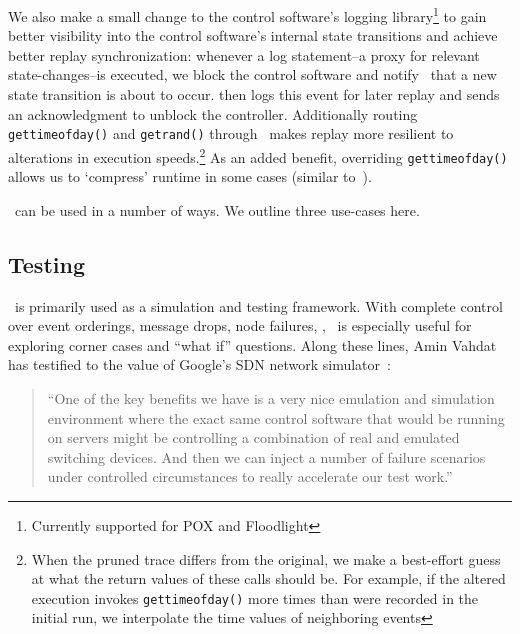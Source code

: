 We also make a
small change to the control software's logging library\footnote{Currently
supported for POX
and Floodlight} to gain better visibility into the control software's internal state
transitions and achieve better replay synchronization: whenever a log
statement--a proxy for relevant state-changes--is executed, we
block the control software and notify \projectname~that a new state transition
is about to occur. \projectname then logs this event for later replay and
sends an acknowledgment to unblock the controller.
Additionally routing {\tt gettimeofday()} and {\tt getrand()} through
\projectname~makes replay more resilient to alterations in execution
speeds.\footnote{When the pruned trace differs from the original, we make a
best-effort guess at what the return values of these calls should be. For example,
if the altered execution invokes {\tt gettimeofday()} more times than were recorded
in the initial run, we interpolate the time values of neighboring events}
As an added benefit, overriding {\tt gettimeofday()} allows us to `compress'
runtime in some cases (similar to~\cite{Gupta06toinfinity}).

\projectname~can be used in a number of ways. We outline three use-cases here.


\subsection{Testing}

\projectname~is primarily used as a simulation and testing framework.
With complete control over event orderings, message drops, node
failures, \etc, \projectname~is especially useful for exploring corner cases
and ``what if'' questions. Along these lines, Amin Vahdat
has testified to the value of Google's SDN network simulator~\cite{vadhat}:
\begin{quote}
``One of the key benefits we have is a very nice emulation and
simulation environment where the exact same control software that would be
running on servers might be controlling a combination of real and emulated
switching devices. And then we can inject a number of failure scenarios under
controlled circumstances to really accelerate our test work.''
\end{quote}

